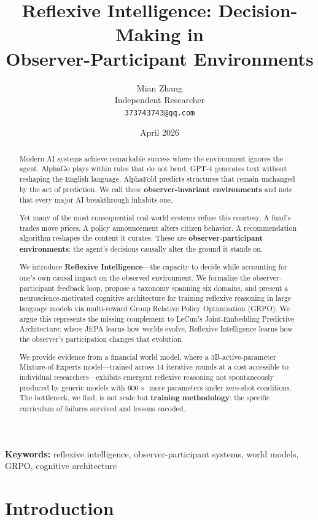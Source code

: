 \documentclass[11pt,a4paper]{article}
\title{\textbf{Reflexive Intelligence: Decision-Making in\\Observer-Participant Environments}}
\author{
  Mian Zhang\\
  Independent Researcher\\
  \texttt{373743743@qq.com}
}
\date{April 2026}
\begin{document}
\maketitle

\begin{abstract}
Modern AI systems achieve remarkable success where the environment ignores the agent. AlphaGo plays within rules that do not bend. GPT-4 generates text without reshaping the English language. AlphaFold predicts structures that remain unchanged by the act of prediction. We call these \textbf{observer-invariant environments} and note that every major AI breakthrough inhabits one.

Yet many of the most consequential real-world systems refuse this courtesy. A fund's trades move prices. A policy announcement alters citizen behavior. A recommendation algorithm reshapes the content it curates. These are \textbf{observer-participant environments}: the agent's decisions causally alter the ground it stands on.

We introduce \textbf{Reflexive Intelligence}---the capacity to decide while accounting for one's own causal impact on the observed environment. We formalize the observer-participant feedback loop, propose a taxonomy spanning six domains, and present a neuroscience-motivated cognitive architecture for training reflexive reasoning in large language models via multi-reward Group Relative Policy Optimization (GRPO). We argue this represents the missing complement to LeCun's Joint-Embedding Predictive Architecture: where JEPA learns how worlds evolve, Reflexive Intelligence learns how the observer's participation changes that evolution.

We provide evidence from a financial world model, where a 3B-active-parameter Mixture-of-Experts model---trained across 14 iterative rounds at a cost accessible to individual researchers---exhibits emergent reflexive reasoning not spontaneously produced by generic models with $600\times$ more parameters under zero-shot conditions. The bottleneck, we find, is not scale but \textbf{training methodology}: the specific curriculum of failures survived and lessons encoded.
\end{abstract}

\noindent\textbf{Keywords:} reflexive intelligence, observer-participant systems, world models, GRPO, cognitive architecture

\section{Introduction}
\end{document}
